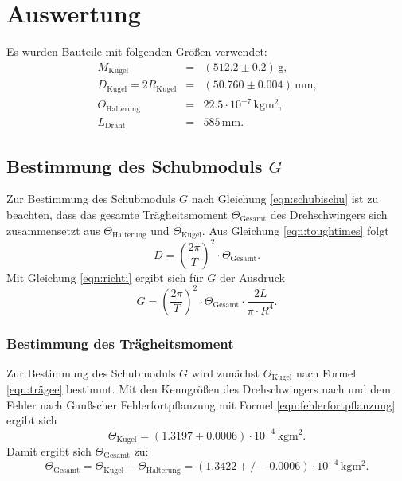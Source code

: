 \section{Auswertung}
\label{sec:Auswertung}
Es wurden Bauteile mit folgenden Größen verwendet:
\begin{equation}
	\label{eqn:bauteile}
	\begin{aligned}
		M_{\mathrm{Kugel}}                       & = & (512.2 \pm 0.2) \,\si{\gram}\text{,}                       \\
		D_{\mathrm{Kugel}} = 2R_{\mathrm{Kugel}} & = & (50.760\pm 0.004)\,\si{\milli\meter} \text{,}              \\
		\Theta_{\mathrm{Halterung}}              & = & 22.5 \cdot 10^{-7} \, \si{\kilo\gram\square\metre}\text{,} \\
		L_{\mathrm{Draht}}                       & = & 585 \,\si{\milli\meter} \text{.}
	\end{aligned}
\end{equation}
\FloatBarrier

\subsection{Bestimmung des Schubmoduls $G$}
Zur Bestimmung des Schubmoduls $G$ nach Gleichung \eqref{eqn:schubischu} ist zu beachten,
dass das gesamte Trägheitsmoment $\Theta_{\mathrm{Gesamt}}$ des Drehschwingers sich zusammensetzt aus
$\Theta_{\mathrm{Halterung}}$ und $\Theta_{\mathrm{Kugel}}$.
Aus Gleichung \eqref{eqn:toughtimes} folgt
\begin{equation*}
	\label{eqn:dattD}
	D=\left(\frac{2\pi}{T}\right)^2 \cdot \Theta_{\mathrm{Gesamt}} \mathrm{.}
\end{equation*}
Mit Gleichung \eqref{eqn:richti} ergibt sich für $G$ der Ausdruck
\begin{equation*}
	\label{eqn:richtigerG}
	G=\left(\frac{2\pi}{T}\right)^2 \cdot \Theta_{\mathrm{Gesamt}}\cdot \frac{2L}{\pi\cdot R^4} \mathrm{.}
\end{equation*}
\subsubsection{Bestimmung des Trägheitsmoment}
Zur Bestimmung des Schubmoduls $G$ wird zunächst $\Theta_{\mathrm{Kugel}}$ nach Formel \eqref{eqn:trägee} bestimmt.
Mit den Kenngrößen des Drehschwingers nach  und dem Fehler nach Gaußscher Fehlerfortpflanzung mit Formel \eqref{eqn:fehlerfortpflanzung} ergibt sich
\begin{equation*}
	\Theta_{\mathrm{Kugel}}=(1.3197\pm 0.0006) \cdot 10^{-4} \,\si{\kilo\gram \square\metre} \text{.}
\end{equation*}
Damit ergibt sich $\Theta_{\mathrm{Gesamt}}$ zu:
\begin{equation*}
	\label{eqn:trägemasse}
	\Theta_{\mathrm{Gesamt}}= \Theta_{\mathrm{Kugel}}+\Theta_{\mathrm{Halterung}}= (1.3422+/-0.0006)
	\cdot 10^{-4} \,\si{\kilo\gram \square\metre} \text{.}
\end{equation*}
